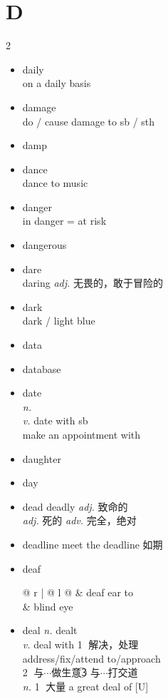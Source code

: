 \documentclass[../../book.tex]{subfiles}
\begin{document}
\section{D}
\raggedcolumns
\begin{multicols}{2}
\begin{itemize}
\item[-] daily
\\on a daily basis
\item[-] damage
\\do / cause damage to sb / sth
\item[-] damp
\item[-] dance
\\dance to music
\item[-] danger
\\in danger = at risk
\item[-] dangerous
\item[-] dare
\\daring \emph{adj.} 无畏的，敢于冒险的
\item[-] dark
\\dark / light blue
\item[-] data
\item[-] database
\item[-] date
\\\emph{n.}
\\\emph{v.} date with sb
\\make an appointment with
\item[-] daughter
\item[-] day
\item[-] dead \phantom{a} deadly \emph{adj.} 致命的
\\\emph{adj.} 死的 \emph{adv.} 完全，绝对
\item[-] deadline \phantom{a} meet the deadline 如期
\item[-] deaf
\\\begin{tabular}{@{} r | @{\hspace{0.1em}} l @{}}
 & deaf ear to
\\& blind eye
\end{tabular}
\item[-] deal \phantom{a} \emph{n.} dealt
\\\emph{v.} deal with \textcircled{1} 解决，处理\\address/fix/attend to/approach
\\\textcircled{2} 与$\cdots$做生意\textcircled{3} 与$\cdots$打交道
\\\emph{n.} \textcircled{1} 大量 a great deal of [U]

\end{itemize}
\end{multicols}
\end{document}
